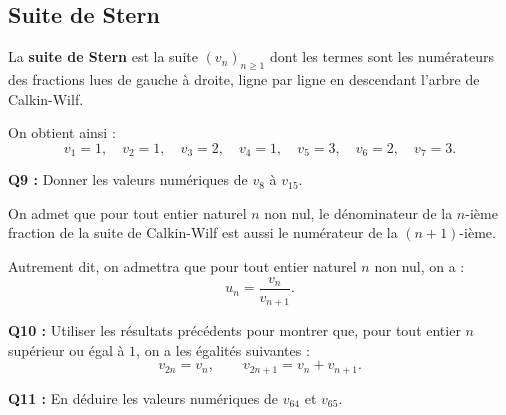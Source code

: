 \documentclass[a4paper,11pt]{article}
\begin{document}
\subsection*{Suite de Stern}

La \textbf{suite de Stern} est la suite $(v_n)_{n \geq 1}$ dont les termes sont les numérateurs des fractions lues de gauche à droite, ligne par ligne en descendant l’arbre de Calkin-Wilf.  

On obtient ainsi :  
\[
v_1 = 1, \quad v_2 = 1, \quad v_3 = 2, \quad v_4 = 1, \quad v_5 = 3, \quad v_6 = 2, \quad v_7 = 3.
\]

\textbf{Q9 :} Donner les valeurs numériques de $v_8$ à $v_{15}$.  

On admet que pour tout entier naturel $n$ non nul, le dénominateur de la $n$-ième fraction de la suite de Calkin-Wilf est aussi le numérateur de la $(n+1)$-ième.  

Autrement dit, on admettra que pour tout entier naturel $n$ non nul, on a :  
\[
u_n = \dfrac{v_n}{v_{n+1}}.
\]

\textbf{Q10 :} Utiliser les résultats précédents pour montrer que, pour tout entier $n$ supérieur ou égal à $1$, on a les égalités suivantes :  
\[
v_{2n} = v_n, 
\qquad 
v_{2n+1} = v_n + v_{n+1}.
\]

\textbf{Q11 :} En déduire les valeurs numériques de $v_{64}$ et $v_{65}$.
\end{document}
